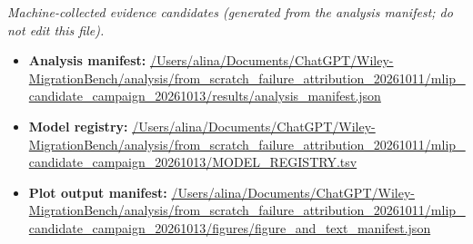 \emph{Machine-collected evidence candidates (generated from the analysis manifest; do not edit this file).}
\begin{itemize}[leftmargin=1.4em,noitemsep]
\item \textbf{Analysis manifest:} \url{/Users/alina/Documents/ChatGPT/Wiley-MigrationBench/analysis/from_scratch_failure_attribution_20261011/mlip_candidate_campaign_20261013/results/analysis_manifest.json}
\item \textbf{Model registry:} \url{/Users/alina/Documents/ChatGPT/Wiley-MigrationBench/analysis/from_scratch_failure_attribution_20261011/mlip_candidate_campaign_20261013/MODEL_REGISTRY.tsv}
\item \textbf{Plot output manifest:} \url{/Users/alina/Documents/ChatGPT/Wiley-MigrationBench/analysis/from_scratch_failure_attribution_20261011/mlip_candidate_campaign_20261013/figures/figure_and_text_manifest.json}
\end{itemize}
